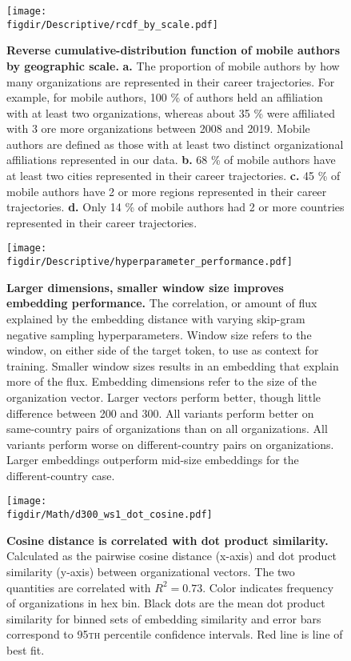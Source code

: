 \documentclass[12pt]{article} %
\def\figdir{../Figs}
\begin{document}
\newpage
%
%
\begin{figure}[p!]
	\centering
	\texttt{[image: \\figdir/Descriptive/rcdf\_by\_scale.pdf]}
	\caption{
		\textbf{Reverse cumulative-distribution function of mobile authors by geographic scale.}
		\textbf{a.}
		The proportion of mobile authors by how many organizations are represented in their career trajectories.
		For example, for mobile authors, 100 \% of authors held an affiliation with at least two organizations, whereas about 35 \% were affiliated with 3 ore more organizations between 2008 and 2019.
		Mobile authors are defined as those with at least two distinct organizational affiliations represented in our data.
		\textbf{b.} 68 \% of mobile authors have at least two cities represented in their career trajectories.
		\textbf{c.} 45 \% of mobile authors have 2 or more regions represented in their career trajectories.
		\textbf{d.} Only 14 \% of mobile authors had 2 or more countries represented in their career trajectories.
	}
	\label{fig:supp:rcdf_by_scale}
\end{figure}




%
%
\begin{figure}[p!]
	\centering
	\texttt{[image: \\figdir/Descriptive/hyperparameter\_performance.pdf]}
	\caption{
		\textbf{Larger dimensions, smaller window size improves embedding performance.}
		The correlation, or amount of flux explained by the embedding distance with varying skip-gram negative sampling hyperparameters.
		Window size refers to the window, on either side of the target token, to use as context for training.
		Smaller window sizes results in an embedding that explain more of the flux.
		Embedding dimensions refer to the size of the organization vector.
		Larger vectors perform better, though little difference between 200 and 300.
		All variants perform better on same-country pairs of organizations than on all organizations.
		All variants perform worse on different-country pairs on organizations.
		Larger embeddings outperform mid-size embeddings for the different-country case.
	}
	\label{fig:supp:cosdot}
\end{figure}


%
%
\begin{figure}[p!]
	\centering
	\texttt{[image: \\figdir/Math/d300\_ws1\_dot\_cosine.pdf]}
	\caption{
		\textbf{Cosine distance is correlated with dot product similarity.}
		Calculated as the pairwise cosine distance (x-axis) and dot product similarity (y-axis) between organizational vectors.
		The two quantities are correlated with $R^{2} = 0.73$.
		Color indicates frequency of organizations in hex bin.
		Black dots are the mean dot product similarity for binned sets of embedding similarity and error bars correspond to 95\textsc{th} percentile confidence intervals.
		Red line is line of best fit.
	}
	\label{fig:supp:hyperparams}
\end{figure}
\end{document}
